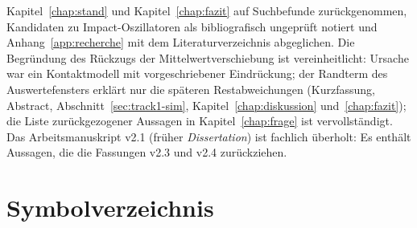 \documentclass[12pt,a4paper]{report}
\begin{document}
Kapitel~\ref{chap:stand} und Kapitel~\ref{chap:fazit} auf Suchbefunde
zurückgenommen, Kandidaten zu Impact-Oszillatoren als bibliografisch
ungeprüft notiert und Anhang~\ref{app:recherche} mit dem
Literaturverzeichnis abgeglichen. Die Begründung des Rückzugs der
Mittelwertverschiebung ist vereinheitlicht: Ursache war ein Kontaktmodell
mit vorgeschriebener Eindrückung; der Randterm des Auswertefensters
erklärt nur die späteren Restabweichungen (Kurzfassung, Abstract,
Abschnitt~\ref{sec:track1-sim}, Kapitel~\ref{chap:diskussion}
und~\ref{chap:fazit}); die Liste zurückgezogener Aussagen in
Kapitel~\ref{chap:frage} ist vervollständigt. Das Arbeitsmanuskript v2.1 (früher
\emph{Dissertation}) ist fachlich überholt: Es enthält Aussagen, die die
Fassungen v2.3 und v2.4 zurückziehen.

\clearpage

\chapter*{Symbolverzeichnis}
\end{document}
